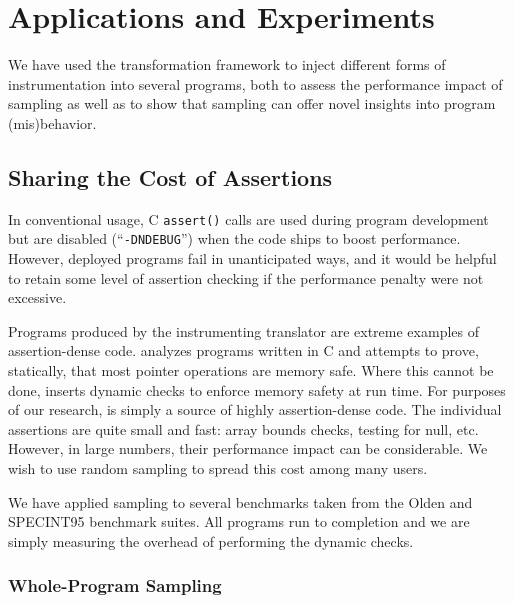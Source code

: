\section{Applications and Experiments}
\label{sec:applications}

We have used the transformation framework to inject different forms of
instrumentation into several programs, both to assess the performance
impact of sampling as well as to show that sampling can offer novel
insights into program (mis)behavior.

\subsection{Sharing the Cost of Assertions}
\label{sec:share}

In conventional usage, C \texttt{assert()} calls are used during
program development but are disabled (``\texttt{-DNDEBUG}'') when the
code ships to boost performance.  However, deployed programs fail in
unanticipated ways, and it would be helpful to retain some level of
assertion checking if the performance penalty were not excessive.

Programs produced by the \CCured instrumenting translator
\cite{POPL_'02*128} are extreme examples of assertion-dense code.
\CCured analyzes programs written in C and attempts to prove,
statically, that most pointer operations are memory safe.  Where this
cannot be done, \CCured inserts dynamic checks to enforce memory
safety at run time.  For purposes of our research, \CCured is simply a
source of highly assertion-dense code.  The individual assertions are
quite small and fast: array bounds checks, testing for null, etc.
However, in large numbers, their performance impact can be
considerable.  We wish to use random sampling to spread this cost
among many users.

We have applied sampling to several benchmarks taken from the Olden
\cite{Carlisle:1996:OPPWDDSDMM} and SPECINT95 \cite{SPEC95} benchmark
suites.  All programs run to completion and we are simply measuring
the overhead of performing the dynamic checks.

\subsubsection{Whole-Program Sampling}
\label{sec:share:whole}


